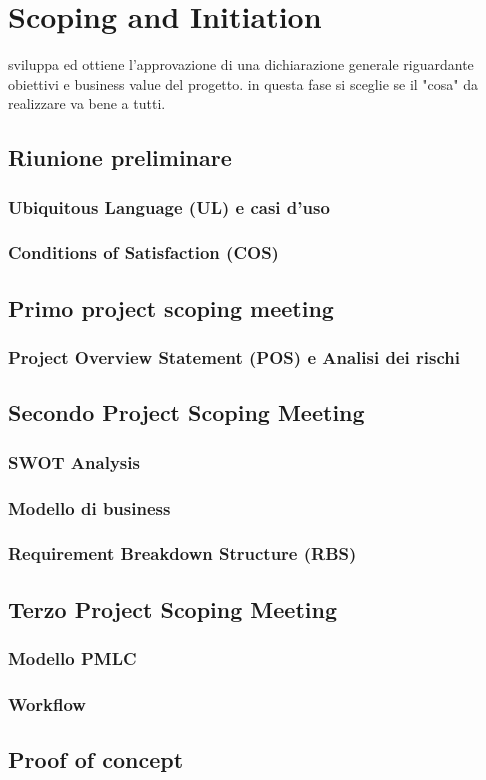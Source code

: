 \section{Scoping and Initiation}

sviluppa ed ottiene l'approvazione di una dichiarazione generale riguardante obiettivi e business value del progetto.
in questa fase si sceglie se il "cosa" da realizzare va bene a tutti.


\subsection{Riunione preliminare}
\subsubsection{Ubiquitous Language (UL) e casi d'uso}
\subsubsection{Conditions of Satisfaction (COS)}

\subsection{Primo project scoping meeting}
\subsubsection{Project Overview Statement (POS) e Analisi dei rischi}

\subsection{Secondo Project Scoping Meeting}
\subsubsection{SWOT Analysis}
\subsubsection{Modello di business}
\subsubsection{Requirement Breakdown Structure (RBS)}

\subsection{Terzo Project Scoping Meeting}
\subsubsection{Modello PMLC}
\subsubsection{Workflow}

\subsection{Proof of concept}
